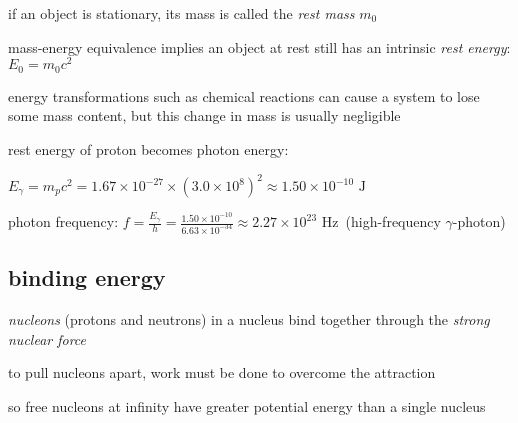 \cmt if an object is stationary, its mass is called the \emph{rest mass} $m_0$

mass-energy equivalence implies an object at rest still has an intrinsic \emph{rest energy}: $E_0 = m_0 c^2$

\cmt energy transformations such as chemical reactions can cause a system to lose some mass content, but this change in mass is usually negligible

\newpage


\begin{soln}rest energy of proton becomes photon energy:

{

\centering

$E_\gamma=m_pc^2 = 1.67\times10^{-27} \times (3.0\times10^8)^2 \approx 1.50\times10^{-10} \text{ J}$

}

photon frequency: $f=\frac{E_\gamma}{h} = \frac{1.50\times10^{-10}}{6.63\times10^{-34}} \approx 2.27 \times10^{23} \text{ Hz}\,$ (high-frequency $\gamma$-photon) \end{soln}





\subsection{binding energy}

\emph{nucleons} (protons and neutrons) in a nucleus bind together through the \emph{strong nuclear force}

to pull nucleons apart, work must be done to overcome the attraction

so free nucleons at infinity have greater potential energy than a single nucleus

